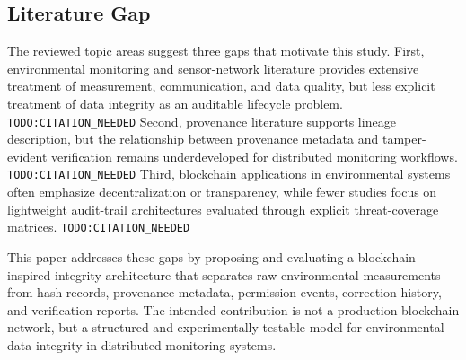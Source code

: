 \subsection{Literature Gap}

The reviewed topic areas suggest three gaps that motivate this study. First, environmental monitoring and sensor-network literature provides extensive treatment of measurement, communication, and data quality, but less explicit treatment of data integrity as an auditable lifecycle problem. \texttt{TODO:CITATION\_NEEDED} Second, provenance literature supports lineage description, but the relationship between provenance metadata and tamper-evident verification remains underdeveloped for distributed monitoring workflows. \texttt{TODO:CITATION\_NEEDED} Third, blockchain applications in environmental systems often emphasize decentralization or transparency, while fewer studies focus on lightweight audit-trail architectures evaluated through explicit threat-coverage matrices. \texttt{TODO:CITATION\_NEEDED}

This paper addresses these gaps by proposing and evaluating a blockchain-inspired integrity architecture that separates raw environmental measurements from hash records, provenance metadata, permission events, correction history, and verification reports. The intended contribution is not a production blockchain network, but a structured and experimentally testable model for environmental data integrity in distributed monitoring systems.
